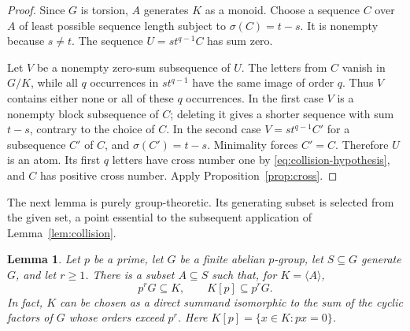 \documentclass[11pt,reqno]{amsart}
\numberwithin{equation}{section}
\newtheorem{lemma}[theorem]{Lemma}
\theoremstyle{definition}
\theoremstyle{remark}
\begin{document}
\begin{proof}
Since $G$ is torsion, $A$ generates $K$ as a monoid. Choose a
sequence $C$ over $A$ of least possible sequence length subject to
$\sigma(C)=t-s$. It is nonempty because $s\ne t$. The sequence
$U=st^{q-1}C$ has sum zero.

Let $V$ be a nonempty zero-sum subsequence of $U$. The letters from
$C$ vanish in $G/K$, while all $q$ occurrences in $st^{q-1}$ have
the same image of order $q$. Thus $V$ contains either none or all
of these $q$ occurrences. In the first case $V$ is a nonempty block
subsequence of $C$; deleting it gives a shorter sequence with sum
$t-s$, contrary to the choice of $C$. In the second case
$V=st^{q-1}C'$ for a subsequence $C'$ of $C$, and
$\sigma(C')=t-s$. Minimality forces $C'=C$. Therefore $U$ is an
atom. Its first $q$ letters have cross number one by
\eqref{eq:collision-hypothesis}, and $C$ has positive cross number.
Apply Proposition~\ref{prop:cross}.
\end{proof}

The next lemma is purely group-theoretic. Its generating subset is
selected from the given set, a point essential to the subsequent
application of Lemma~\ref{lem:collision}.

\begin{lemma}\label{lem:finite-separator}
Let $p$ be a prime, let $G$ be a finite abelian $p$-group, let
$S\subseteq G$ generate $G$, and let $r\ge1$. There is a subset
$A\subseteq S$ such that, for $K=\langle A\rangle$,
\begin{equation}\label{eq:finite-separator}
 p^rG\subseteq K,\qquad K[p]\subseteq p^rG.
\end{equation}
In fact, $K$ can be chosen as a direct summand isomorphic to the
sum of the cyclic factors of $G$ whose orders exceed $p^r$.
Here $K[p]=\{x\in K:px=0\}$.
\end{lemma}
\end{document}
